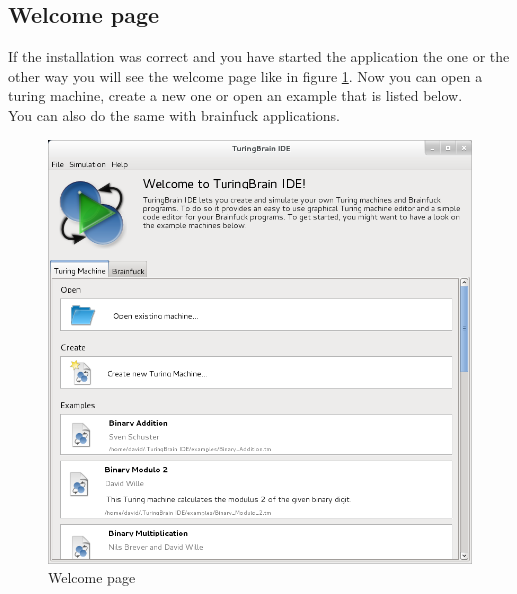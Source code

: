 \documentclass[%
  a4paper,%
  11pt,%
  blue,%
  hyperref	%
  ]{tubsartcl}
\begin{document}
\clearpage

\subsection{Welcome page}
\label{sec:welcome-page}
If the installation was correct and you have started the application the one or the other way you will see the welcome page like in figure \ref{pic:welcome_page}. Now you can open a turing machine, create a new one or open an example that is listed below. \\
You can also do the same with brainfuck applications.
\begin{figure}[!htb]
\begin{center}
\includegraphics[scale=0.45]{graphics_gui/welcomescreen.png}
\end{center}
\caption{Welcome page}
\label{pic:welcome_page}
\end{figure}

\clearpage
\end{document}
